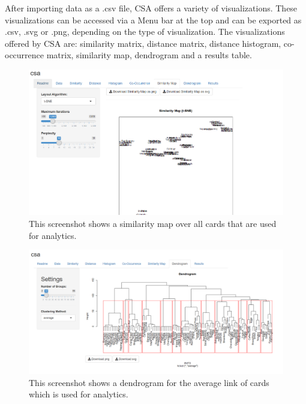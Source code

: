 After importing data as a .csv file, CSA offers a variety of visualizations. 
These visualizations can be accessed via a Menu bar at the top and can be 
exported as .csv, .svg or .png, depending on the type of visualization. The 
visualizations offered by CSA are: similarity matrix, distance matrix, distance 
histogram, co-occurrence matrix, similarity map, dendrogram and a results 
table. 


\begin{figure}[tp] 
\centering
\includegraphics[keepaspectratio,width=\linewidth,height=\halfh]{images/csa-similarity.png}
\caption[CSA Similarity Map] { This screenshot shows a similarity map over
all cards that are used for analytics.
 }
\label{fig:CSA2}
\end{figure}

\begin{figure}[tp] 
\centering
\includegraphics[keepaspectratio,width=\linewidth,height=\halfh]{images/csa-dendrogram.png}
\caption[CSA Dendrogram] { This screenshot shows a dendrogram 
for the average link of cards which is used for analytics.
 }
\label{fig:CSA3}
\end{figure}

